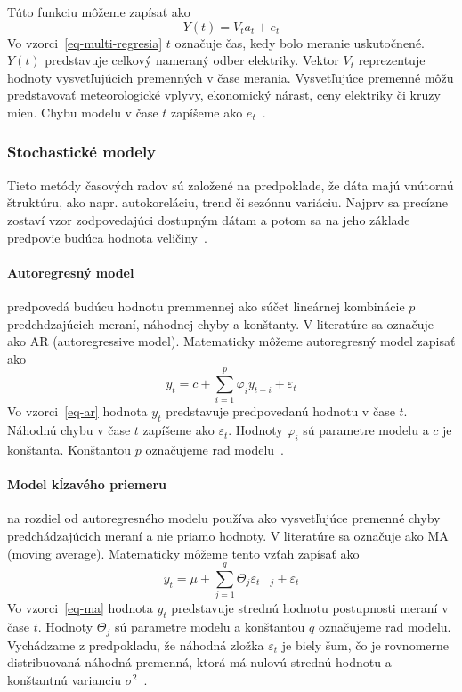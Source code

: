 \documentclass[a4paper,slovak,12pt,appendix]{article}
\begin{document}
Túto funkciu môžeme zapísať ako
\begin{equation}
  Y(t) = V_t a_t + e_t
  \label{eq-multi-regresia}
\end{equation}
Vo vzorci~\ref{eq-multi-regresia} $t$ označuje čas, kedy bolo meranie
uskutočnené. $Y(t)$ predstavuje celkový nameraný odber elektriky. Vektor $V_t$
reprezentuje hodnoty vysvetľujúcich premenných v čase merania. Vysvetľujúce
premenné môžu predstavovať meteorologické vplyvy, ekonomický nárast, ceny
elektriky či kruzy mien. Chybu modelu v čase $t$ zapíšeme
ako $e_t$~\cite{KumarSingh2013, Mahalakshmi2016}.


\subsubsection{Stochastické modely}
Tieto metódy časových radov sú založené na predpoklade, že dáta majú vnútornú
štruktúru, ako napr. autokoreláciu, trend či sezónnu variáciu. Najprv sa
precízne zostaví vzor zodpovedajúci dostupným dátam a potom sa na jeho základe
predpovie budúca hodnota veličiny~\cite{KumarSingh2013}.

\paragraph{Autoregresný model} predpovedá budúcu hodnotu premmennej ako súčet
lineárnej kombinácie $p$ predchdzajúcich meraní, náhodnej chyby a konštanty.
V literatúre sa označuje ako AR (autoregressive model). Matematicky môžeme
autoregresný model zapisať ako
\begin{equation}
  y_t = c + \sum_{i=1}^{p} \varphi_i y_{t-i} + \varepsilon_t
  \label{eq-ar}
\end{equation}
Vo vzorci~\ref{eq-ar} hodnota $y_t$ predstavuje predpovedanú hodnotu
v čase $t$. Náhodnú chybu v čase $t$ zapíšeme ako $\varepsilon_t$. Hodnoty
$\varphi_i$ sú parametre modelu a $c$ je konštanta. Konštantou $p$ označujeme
rad modelu~\cite{Agrawal2013}.

\paragraph{Model kĺzavého priemeru} na rozdiel od autoregresného modelu používa
ako vysvetľujúce premenné chyby predchádzajúcich meraní a nie priamo hodnoty.
V literatúre sa označuje ako MA (moving average). Matematicky môžeme tento
vzťah zapísať ako
\begin{equation}
  y_t = \mu + \sum_{j=1}^{q} \Theta_j \varepsilon_{t-j} + \varepsilon_t
  \label{eq-ma}
\end{equation}
Vo vzorci~\ref{eq-ma} hodnota $y_t$ predstavuje strednú hodnotu
postupnosti meraní v čase $t$. Hodnoty $\Theta_j$ sú parametre modelu
a konštantou $q$ označujeme rad modelu. Vychádzame z predpokladu, že náhodná
zložka $\varepsilon_t$ je biely šum, čo je rovnomerne distribuovaná náhodná
premenná, ktorá má nulovú strednú hodnotu a konštantnú varianciu
$\sigma^2$~\cite{Agrawal2013}.
\end{document}
